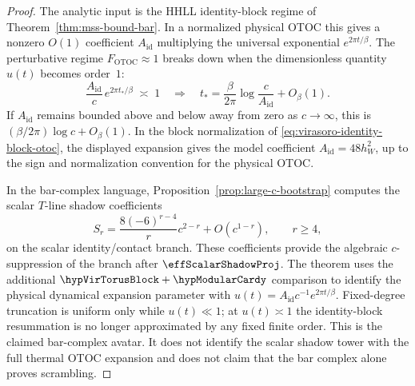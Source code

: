 \begin{proof}
The analytic input is the HHLL identity-block regime of
Theorem~\ref{thm:mss-bound-bar}.  In a normalized physical OTOC this
gives a nonzero \(O(1)\) coefficient \(A_{\mathrm{id}}\) multiplying
the universal exponential \(e^{2\pi t/\beta}\).  The perturbative
regime \(F_{\mathrm{OTOC}}\approx1\) breaks down when the dimensionless
quantity \(u(t)\) becomes order~\(1\):
\[
\frac{A_{\mathrm{id}}}{c}\,e^{2\pi t_*/\beta}\;\asymp\;1
\quad\Longrightarrow\quad
t_*=\frac{\beta}{2\pi}\log\frac{c}{A_{\mathrm{id}}}+O_\beta(1).
\]
If \(A_{\mathrm{id}}\) remains bounded above and below away from zero
as \(c\to\infty\), this is
\((\beta/2\pi)\log c+O_\beta(1)\).  In the block normalization of
\eqref{eq:virasoro-identity-block-otoc}, the displayed expansion gives
the model coefficient \(A_{\mathrm{id}}=48h_W^2\), up to the sign and
normalization convention for the physical OTOC.

In the bar-complex language, Proposition~\ref{prop:large-c-bootstrap}
computes the scalar \(T\)-line shadow coefficients
\[
S_r=\frac{8(-6)^{r-4}}{r}c^{2-r}+O(c^{1-r}),\qquad r\ge4,
\]
on the scalar identity/contact branch.  These coefficients provide the
algebraic \(c\)-suppression of the branch after
\(\effScalarShadowProj\).  The theorem uses the additional
\(\hypVirTorusBlock+\hypModularCardy\) comparison to identify the
physical dynamical expansion parameter with
\(u(t)=A_{\mathrm{id}}c^{-1}e^{2\pi t/\beta}\).  Fixed-degree
truncation is uniform only while \(u(t)\ll1\); at \(u(t)\asymp1\) the
identity-block resummation is no longer approximated by any fixed
finite order.  This is the claimed bar-complex avatar.  It does not
identify the scalar shadow tower with the full thermal OTOC expansion
and does not claim that the bar complex alone proves scrambling.
\end{proof}

